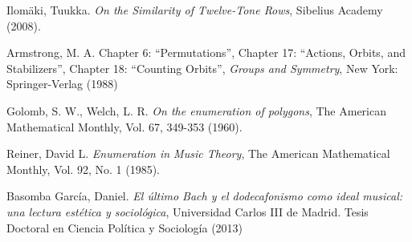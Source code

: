 \begin{thebibliography}{00}
			{\sc Ilom\"aki, Tuukka.}
			\textit{On the Similarity of Twelve-Tone Rows},
			Sibelius Academy
			(2008).
			
			
			{\sc Armstrong, M. A.} Chapter 6: “Permutations”, Chapter 17: “Actions, Orbits, and Stabilizers”, Chapter 18: “Counting Orbits”,
			\textit{Groups and Symmetry},
			New York: Springer-Verlag
			(1988)
			
			
			{\sc Golomb, S. W., Welch, L. R.}
			\textit{On the enumeration of polygons},
			The American Mathematical Monthly, Vol. 67, 349-353
			(1960).
			
			{\sc Reiner, David L.}
			\textit{Enumeration in Music Theory},
			The American Mathematical Monthly, Vol. 92, No. 1
			(1985).
			
			
			{\sc Basomba García, Daniel.} 
			\textit{El último Bach y el dodecafonismo como ideal musical: una lectura estética y sociológica},
			Universidad Carlos III de Madrid.
			Tesis Doctoral en Ciencia Política y Sociología
			(2013)
			
			
			
			
			
			
						
	\end{thebibliography}